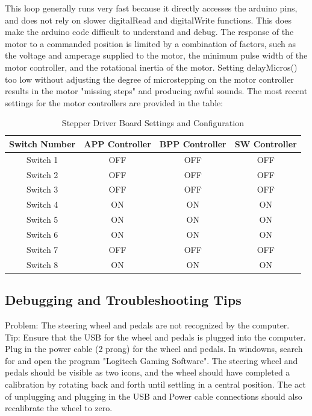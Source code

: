 \documentclass{article}
\begin{document}
This loop generally runs very fast because it directly accesses the arduino pins, and does not rely on slower digitalRead and digitalWrite functions. This does make the arduino code difficult to understand and debug. The response of the motor to a commanded position is limited by a combination of factors, such as the voltage and amperage supplied to the motor, the minimum pulse width of the motor controller, and the rotational inertia of the motor. Setting delayMicros() too low without adjusting the degree of microstepping on the motor controller results in the motor "missing steps" and producing awful sounds. The most recent settings for the motor controllers are provided in the table: 

\begin{table}[h]
\centering
 \begin{tabular}{| c | c | c | c|}
 \hline
 Switch Number & APP Controller & BPP Controller & SW Controller \\
 \hline 
 Switch 1 & OFF & OFF  & OFF \\
 Switch 2 & OFF & OFF & OFF \\
 Switch 3 & OFF & OFF & OFF \\
 Switch 4 & ON & ON & ON \\
 Switch 5 & ON & ON & ON \\
 Switch 6 & ON & ON & ON \\
 Switch 7 & OFF& OFF & OFF \\
 Switch 8 & ON & ON & ON \\

 \hline
 \end{tabular}
 \caption{Stepper Driver Board Settings and Configuration}
 \label{table:StepperSettings}
\end{table}

\label{table: Most Recent Settings for Motor Controllers}

\subsection{Debugging and Troubleshooting Tips}

Problem: The steering wheel and pedals are not recognized by the computer. \\
Tip: Ensure that the USB for the wheel and pedals is plugged into the computer. Plug in the power cable (2 prong) for the wheel and pedals. In windowns, search for and open the program "Logitech Gaming Software". The steering wheel and pedals should be visible as two icons, and the wheel should have completed a calibration by rotating back and forth until settling in a central position. The act of unplugging and plugging in the USB and Power cable connections should also recalibrate the wheel to zero. \label{poi:Calibration} \\
\end{document}
